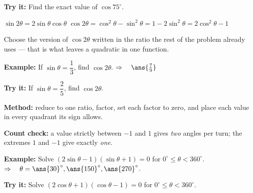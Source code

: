 \documentclass[12pt]{article}
\begin{document}
\begin{tryitbox}
\textbf{Try it:} \quad Find the exact value of $\cos 75^\circ$.\\[2pt]
\end{tryitbox}


\begin{formulabox}
$\sin 2\theta = 2\sin\theta\cos\theta$ \qquad $\cos 2\theta = \cos^2\theta - \sin^2\theta = 1 - 2\sin^2\theta = 2\cos^2\theta - 1$\par
Choose the version of $\cos 2\theta$ written in the ratio the rest of the problem already uses --- that is what leaves a quadratic in one function.
\end{formulabox}

\begin{examplebox}
\textbf{Example:} \quad If $\sin\theta = \dfrac{1}{3}$, find $\cos 2\theta$.
$\Rightarrow\quad \ans{\tfrac{7}{9}}$
\end{examplebox}

\begin{tryitbox}
\textbf{Try it:} \quad If $\sin\theta = \dfrac{2}{5}$, find $\cos 2\theta$.\\[2pt]
\end{tryitbox}


\begin{formulabox}
\textbf{Method:} reduce to one ratio, factor, set each factor to zero, and place each value in every quadrant its sign allows.\par
\textbf{Count check:} a value strictly between $-1$ and $1$ gives \emph{two} angles per turn; the extremes $1$ and $-1$ give exactly \emph{one}.
\end{formulabox}

\begin{examplebox}
\textbf{Example:} \quad Solve $(2\sin\theta - 1)(\sin\theta + 1) = 0$ for $0^\circ \le \theta < 360^\circ$.
$\Rightarrow\quad \theta = \ans{30}^\circ, \ans{150}^\circ, \ans{270}^\circ$.
\end{examplebox}

\begin{tryitbox}
\textbf{Try it:} \quad Solve $(2\cos\theta + 1)(\cos\theta - 1) = 0$ for $0^\circ \le \theta < 360^\circ$.\\[2pt]
\end{tryitbox}
\end{document}
